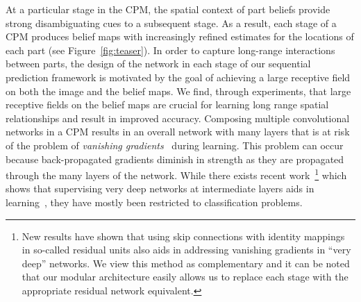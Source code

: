 \documentclass[10pt,twocolumn,letterpaper]{article}
\begin{document}
At a particular stage in the CPM, the spatial context of part beliefs provide strong disambiguating cues to a subsequent stage. As a result, each stage of a CPM produces belief maps with increasingly refined estimates for the locations of each part (see Figure~\ref{fig:teaser}). 
In order to capture long-range interactions between parts, the design of the network in each stage of our sequential prediction framework is motivated by the goal of achieving a large receptive field on both the image and the belief maps. We find, through experiments, that large receptive fields on the belief maps are crucial for learning long range spatial relationships and result in improved accuracy.
Composing multiple convolutional networks in a CPM results in an overall network with many layers that is at risk of the problem of
\emph{vanishing gradients}~\cite{hochreiter2001gradient,bradley2010learning,glorot2010understanding,bengio1994learning} during learning. 
This problem can occur because back-propagated gradients diminish in strength as they are propagated through the many layers of the network. 
While there exists recent work~\footnote{New results have shown that using skip connections with identity mappings~\cite{he15arxiv} in so-called residual units also aids in addressing vanishing gradients in ``very deep'' networks. We view this method as complementary and it can be noted that our modular architecture easily allows us to replace each stage with the appropriate residual network equivalent.} which shows that supervising very deep networks at intermediate layers aids in learning~\cite{lee2014deeply,szegedy2014going}, they have mostly been restricted to classification problems.
\end{document}
